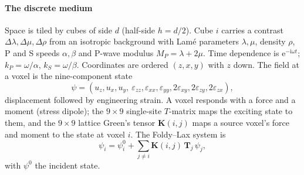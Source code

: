 \documentclass[preprint,review,12pt]{elsarticle}
\newcommand{\bT}{\mathbf{T}}
\newcommand{\bK}{\mathbf{K}}
\begin{document}
\paragraph{The discrete medium} Space is tiled by cubes of side $d$ (half-side $h=d/2$). Cube $i$
carries a contrast $\Delta\lambda,\Delta\mu,\Delta\rho$ from an isotropic background with Lamé
parameters $\lambda,\mu$, density $\rho$, P and S speeds $\alpha,\beta$ and P-wave modulus
$M_P=\lambda+2\mu$. Time dependence is $\mathrm{e}^{-\mathrm{i}\omega t}$; $k_P=\omega/\alpha$, $k_S=\omega/\beta$.
Coordinates are ordered $(z,x,y)$ with $z$ down. The field at a voxel is the nine-component state
\begin{equation}
  \psi=(u_z,u_x,u_y,\ \varepsilon_{zz},\varepsilon_{xx},\varepsilon_{yy},
  2\varepsilon_{xy},2\varepsilon_{zy},2\varepsilon_{zx}),
\end{equation}
displacement followed by engineering strain. A voxel responds with a force and a moment (stress
dipole); the $9\times9$ single-site $T$-matrix maps the exciting state to them, and the $9\times9$
lattice Green's tensor $\bK(i,j)$ maps a source voxel's force and moment to the state at voxel $i$.
The Foldy--Lax system is
\begin{equation}\label{eq:foldylax}
  \psi_i=\psi^0_i+\sum_{j\neq i}\bK(i,j)\,\bT_j\,\psi_j ,
\end{equation}
with $\psi^0$ the incident state.
\end{document}
